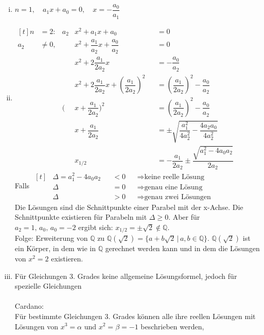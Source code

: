 \documentclass{article}
\begin{document}
\begin{enumerate}[(i)]
    \item $n=1,\quad a_{1}x+a_{0}=0,\quad x=-\dfrac{a_{0}}{a_{1}}$
    \item $\begin{aligned}[t]
        n&=2: & a_{2}&x^{2}+a_{1}x+a_{0} & &=0\\
        a_{2}&\neq 0, & &x^{2}+\dfrac{a_{1}}{a_{2}}x+\dfrac{a_{0}}{a_{2}} & &= 0\\
        & & &x^{2}+2\dfrac{a_{1}}{2a_{2}}x & &= - \dfrac{a_{0}}{a_{2}}\\
        & & &x^{2}+2\dfrac{a_{1}}{2a_{2}}x +(\dfrac{a_{1}}{2a_{2}})^2 & &= (\dfrac{a_{1}}{2a_{2}})^2 - \dfrac{a_{0}}{a_{2}}\\
        & & (&x+\dfrac{a_{1}}{2a_{2}})^2 & &= (\dfrac{a_{1}}{2a_{2}})^2 - \dfrac{a_{0}}{a_{2}}\\
        & & &x+\dfrac{a_{1}}{2a_{2}} & &=\pm\sqrt{\dfrac{a_{1}^{2}}{4a_{2}^{2}} - \dfrac{4a_{2}a_{0}}{4a_{2}^{2}}}\\
        & & &x_{1/2} & &=-\dfrac{a_{1}}{2a_{2}}\pm\dfrac{\sqrt{a_{1}^{2}-4a_{0}a_{2}}}{2a_{2}}
        \end{aligned}$\\
		Falls $\begin{aligned}[t]
            &\Delta = a_{1}^{2}-4a_{0}a_{2} & &< 0 & &\Rightarrow \text{keine reelle Lösung}\\
            &\Delta & &=0 & &\Rightarrow \text{genau eine Lösung}\\
            &\Delta & &> 0 & &\Rightarrow \text{genau zwei Lösungen}
        \end{aligned}$\\
        Die Lösungen sind die Schnittpunkte einer Parabel mit der x-Achse. Die Schnittpunkte existieren für Parabeln mit $\Delta \geq 0$.
        Aber für ${a_{2}=1,\,a_{0},\,a_{0}=-2}$ ergibt sich: $x_{1/2} = \pm \sqrt{2}\notin \mathbb{Q}$.\\
        Folge: Erweiterung von $\mathbb{Q}$ zu $\mathbb{Q}(\sqrt{2})=\{a + b\sqrt{2}\,|\,a,b\in\mathbb{Q}\}$.
        $\mathbb{Q}(\sqrt{2})$ ist ein Körper, in dem wie in $\mathbb{Q}$ gerechnet werden kann und in dem die Lösungen von $x^{2}=2$ existieren.
    \item Für Gleichungen 3. Grades keine allgemeine Lösungsformel, jedoch für spezielle Gleichungen\\\\
        Cardano: \\
        Für bestimmte Gleichungen 3. Grades können alle ihre reellen Lösungen mit Lösungen von $x^{3}=\alpha$ und $x^{2}=\beta=-1$ beschrieben werden,

\end{enumerate}
\end{document}
